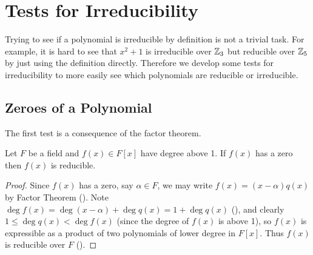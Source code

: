 \section{Tests for Irreducibility}
Trying to see if a polynomial is irreducible by definition is not a trivial task. For example, it is hard to see that $x^2 + 1$ is irreducible over $\mathbb{Z}_3$ but reducible over $\mathbb{Z}_5$ by just using the definition directly. Therefore we develop some tests for irreducibility to more easily see which polynomials are reducible or irreducible.

\subsection{Zeroes of a Polynomial}
The first test is a consequence of the factor theorem.
\begin{theorem}\label{thrm-degree-above-1-reducible-if-has-zero}
    Let $F$ be a field and $f(x) \in F[x]$ have degree above 1. If $f(x)$ has a zero then $f(x)$ is reducible.
\end{theorem}
\begin{proof}
    Since $f(x)$ has a zero, say $\alpha \in F$, we may write $f(x) = (x-\alpha)q(x)$ by Factor Theorem (). Note $\deg f(x) = \deg(x-\alpha) + \deg q(x) = 1 + \deg q(x)$ (), and clearly $1 \leq \deg q(x) < \deg f(x)$ (since the degree of $f(x)$ is above 1), so $f(x)$ is expressible as a product of two polynomials of lower degree in $F[x]$. Thus $f(x)$ is reducible over $F$ ().
\end{proof}

